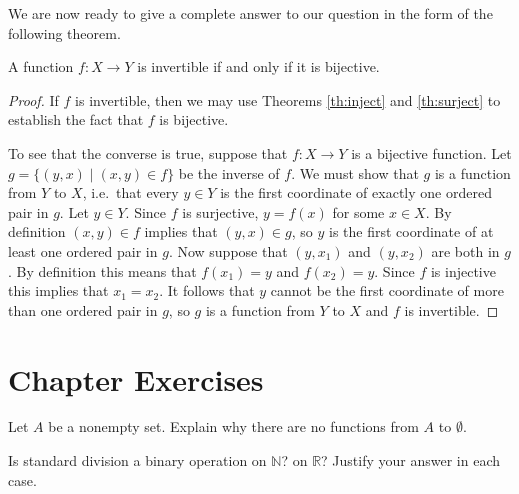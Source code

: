 We are now ready to give a complete answer to our question in the form
of the following theorem.

\begin{thrm}\label{thrm:invert}
A function $f:X\to Y$ is invertible if and only if it is bijective.
\end{thrm}

\begin{proof}
If $f$ is invertible, then we may use Theorems \ref{th:inject} and \ref{th:surject} to establish the fact that $f$ is bijective.

To see that the converse is true, suppose that $f:X\to Y$ is a bijective function.  Let $g=\{(y,x)\mid (x,y)\in f\}$ be the inverse of $f$.  We must show that $g$ is a function from $Y$ to $X$, i.e.~that every $y\in Y$ is the first coordinate of exactly one ordered pair in $g$.  Let $y\in Y$.  Since $f$ is surjective, $y=f(x)$ for some $x\in X$.  By definition $(x,y)\in f$ implies that $(y,x)\in g$, so $y$ is the first coordinate of at least one ordered pair in $g$.    Now suppose that $(y,x_1)$ and $(y,x_2)$ are both in $g$.  By definition this means that $f(x_1)=y$ and $f(x_2)=y$.  Since $f$ is injective this implies that $x_1=x_2$.   It follows that $y$ cannot be the first coordinate of more than one ordered pair in $g$, so $g$ is a function from $Y$ to $X$ and $f$ is invertible.
\end{proof}

\clearpage








\section*{Chapter  Exercises}
\anschapter

\begin{exercise}\label{exer:empty}\markit
Let $A$ be a nonempty set.  Explain why there are no functions from $A$ to $\emptyset$.
\end{exercise}

\begin{exercise}
Is standard division a binary operation on $\mathbb N$?  on $\mathbb R$? Justify your answer in each case.
\end{exercise}

